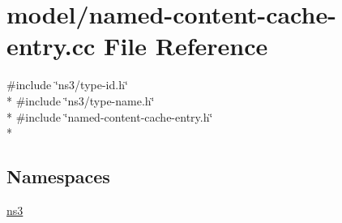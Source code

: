 \hypertarget{named-content-cache-entry_8cc}{\section{model/named-\/content-\/cache-\/entry.cc File Reference}
\label{named-content-cache-entry_8cc}
}
{\ttfamily \#include \char`\"{}ns3/type-\/id.\-h\char`\"{}}\\*
{\ttfamily \#include \char`\"{}ns3/type-\/name.\-h\char`\"{}}\\*
{\ttfamily \#include \char`\"{}named-\/content-\/cache-\/entry.\-h\char`\"{}}\\*
\subsection*{Namespaces}
\begin{DoxyCompactItemize}
\item 
\hyperlink{namespacens3}{ns3}
\end{DoxyCompactItemize}
